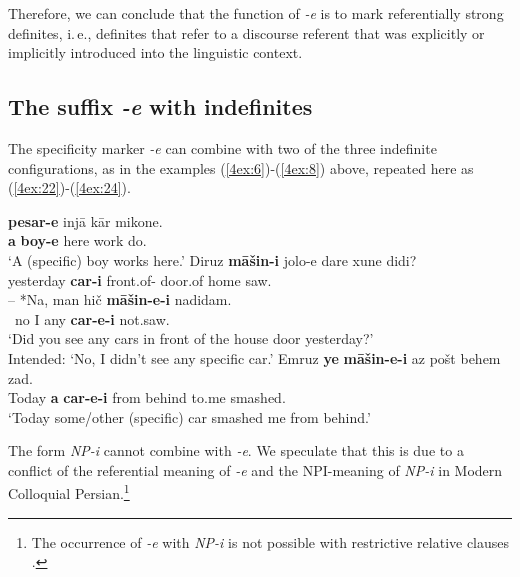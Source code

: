 \documentclass[output=paper]{langsci/langscibook}
\begin{document}
Therefore, we can conclude that the function of {\emph{-e}} is to mark referentially strong definites, i.\,e., definites that refer to a discourse referent that was explicitly or implicitly introduced into the linguistic context.

\subsection{The suffix {\emph{-e}} with indefinites}\label{4sec:42}

The specificity marker {\emph{-e}} can combine with two of the three indefinite configurations, as in the examples (\ref{4ex:6})-(\ref{4ex:8}) above, repeated here as (\ref{4ex:22})-(\ref{4ex:24}).

\begin{exe}
\ex\label{4ex:22}
	{\bf{pesar-e}}	injā	kār   	mikone. \\
	{\bf{a}}    	   	{\bf{boy-e}}    	here 	work do.{} \\
\glt	`A (specific) boy works here.'
\ex\label{4ex:23}
\gll	Diruz        {\bf{māšin-i}}  jolo-e         dare     xune  didi? \\
	yesterday {\bf{car-i}}      front.of-{}   door.of home saw.{} \\
\glt
\exi{}
\gll	-- *Na, man hič  {\bf{māšin-e-i}}  	nadidam. \\
	{} \ no I      any  {\bf{car-e-i}}      		not.saw.{}\\
\glt	`Did you see any cars in front of the house door yesterday?' \\
	Intended: `No, I didn't see any specific car.'
\ex\label{4ex:24}
\gll	Emruz 	{\bf{ye}} {\bf{māšin-e-i}}   	az     pošt 	   	behem 	zad. \\
 	Today 	{\bf{a}}   {\bf{car-e-i}} 	 from behind   	to.me	 smashed.{} \\
\glt	`Today some/other (specific) car smashed me from behind.'  
\end{exe}

The form {\emph{NP-i}} cannot combine with {\emph{-e}}. We speculate that this is due to a conflict of the referential meaning of {\emph{-e}} and the NPI-meaning of {\emph{NP-i}} in Modern Colloquial Persian.\footnote{The occurrence of {\emph{-e}} with {\emph{NP-i}} is not possible with restrictive relative clauses \citep{ghomeshi:03}.}
\end{document}
